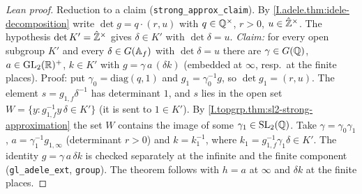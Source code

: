 \begin{proof}[Lean proof]
Reduction to a claim (\texttt{strong\_approx\_claim}). By \cref{I.adele.thm:idele-decomposition} write $\det g=q\cdot(r,u)$ with $q\in\mathbb{Q}^\times$, $r>0$, $u\in\hat{\mathbb{Z}}^\times$. The hypothesis $\det K'=\hat{\mathbb{Z}}^\times$ gives $\delta\in K'$ with $\det\delta=u$. \emph{Claim:} for every open subgroup $K'$ and every $\delta\in G(\mathbb{A}_f)$ with $\det\delta=u$ there are $\gamma\in G(\mathbb{Q})$, $a\in\mathrm{GL}_2(\mathbb{R})^+$, $k\in K'$ with $g=\gamma\,a\,(\delta k)$ (embedded at $\infty$, resp.\ at the finite places). Proof: put $\gamma_0=\mathrm{diag}(q,1)$ and $g_1=\gamma_0^{-1}g$, so $\det g_1=(r,u)$. The element $s=g_{1,f}\delta^{-1}$ has determinant $1$, and $s$ lies in the open set $W=\{y:g_{1,f}^{-1}y\,\delta\in K'\}$ (it is sent to $1\in K'$). By \cref{I.topgrp.thm:sl2-strong-approximation} the set $W$ contains the image of some $\gamma_1\in\mathrm{SL}_2(\mathbb{Q})$. Take $\gamma=\gamma_0\gamma_1$, $a=\gamma_1^{-1}g_{1,\infty}$ (determinant $r>0$) and $k=k_1^{-1}$, where $k_1=g_{1,f}^{-1}\gamma_1\delta\in K'$. The identity $g=\gamma\,a\,\delta k$ is checked separately at the infinite and the finite component (\texttt{gl\_adele\_ext}, \texttt{group}). The theorem follows with $h=a$ at $\infty$ and $\delta k$ at the finite places.
\end{proof}

